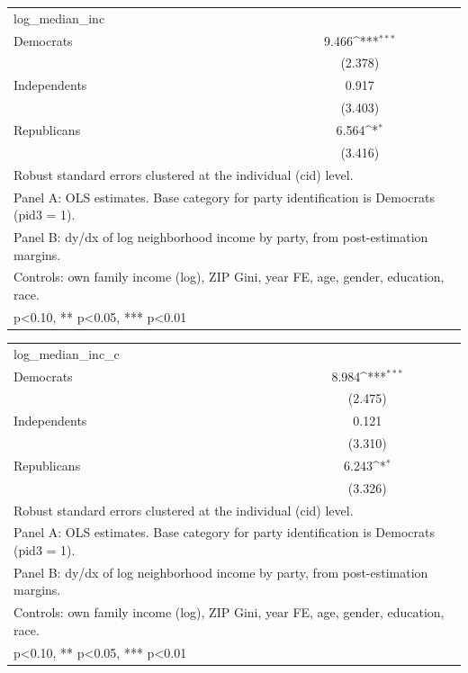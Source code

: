{
\def\sym#1{\ifmmode^{#1}\else\(^{#1}\)\fi}
\begin{tabular}{l*{1}{c}}
\toprule
\midrule
log\_median\_inc&                     \\
Democrats   &       9.466\sym{***}\\
            &     (2.378)         \\
Independents&       0.917         \\
            &     (3.403)         \\
Republicans &       6.564\sym{*}  \\
            &     (3.416)         \\
\bottomrule
\multicolumn{2}{l}{\footnotesize Robust standard errors clustered at the individual (cid) level.}\\
\multicolumn{2}{l}{\footnotesize Panel A: OLS estimates. Base category for party identification is Democrats (pid3 = 1).}\\
\multicolumn{2}{l}{\footnotesize Panel B: dy/dx of log neighborhood income by party, from post-estimation margins.}\\
\multicolumn{2}{l}{\footnotesize Controls: own family income (log), ZIP Gini, year FE, age, gender, education, race.}\\
\multicolumn{2}{l}{\footnotesize * p<0.10, ** p<0.05, *** p<0.01}\\
\end{tabular}
}
{
\def\sym#1{\ifmmode^{#1}\else\(^{#1}\)\fi}
\begin{tabular}{l*{1}{c}}
\toprule
\midrule
log\_median\_inc\_c&                     \\
Democrats   &       8.984\sym{***}\\
            &     (2.475)         \\
Independents&       0.121         \\
            &     (3.310)         \\
Republicans &       6.243\sym{*}  \\
            &     (3.326)         \\
\bottomrule
\multicolumn{2}{l}{\footnotesize Robust standard errors clustered at the individual (cid) level.}\\
\multicolumn{2}{l}{\footnotesize Panel A: OLS estimates. Base category for party identification is Democrats (pid3 = 1).}\\
\multicolumn{2}{l}{\footnotesize Panel B: dy/dx of log neighborhood income by party, from post-estimation margins.}\\
\multicolumn{2}{l}{\footnotesize Controls: own family income (log), ZIP Gini, year FE, age, gender, education, race.}\\
\multicolumn{2}{l}{\footnotesize * p<0.10, ** p<0.05, *** p<0.01}\\
\end{tabular}
}

